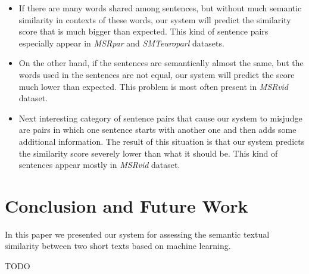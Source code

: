 \documentclass[10pt, a4paper]{article}
\begin{document}
\begin{itemize} \itemsep1pt \parskip0pt 
	\item If there are many words shared among sentences, but without much semantic similarity in contexts of these words, our system will predict the similarity score that is much bigger than expected. This kind of sentence pairs especially appear in \textit{MSRpar} and \textit{SMTeuroparl} datasets.
	
	\item On the other hand, if the sentences are semantically almost the same, but the words used in the sentences are not equal, our system will predict the score much lower than expected. This problem is most often present in \textit{MSRvid} dataset.
	
	\item Next interesting category of sentence pairs that cause our system to misjudge are pairs in which one sentence starts with another one and then adds some additional information. The result of this situation is that our system predicts the similarity score  severely lower than what it should be. This kind of sentences appear mostly in \textit{MSRvid} dataset.
\end{itemize}

\section{Conclusion and Future Work}

In this paper we presented our system for assessing the semantic textual similarity between two short texts based on machine learning. 

TODO

\nocite{*}

 
\end{document}
